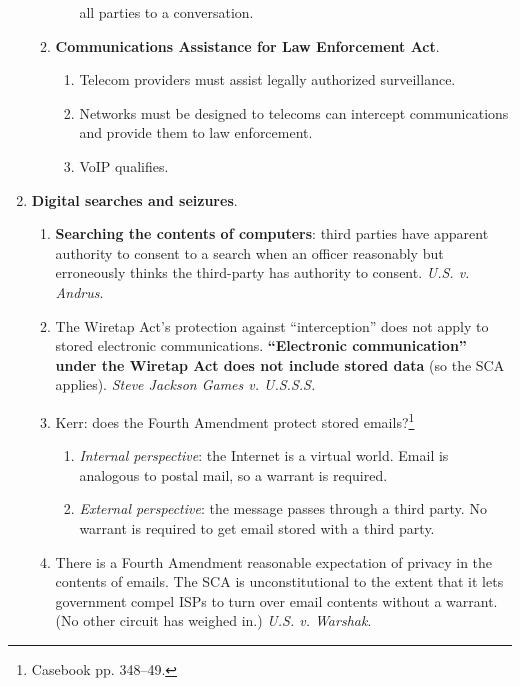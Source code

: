 \begin{enumerate}
\begin{enumerate}
\begin{enumerate}
            all parties to a conversation.
        \end{enumerate}
        \item \textbf{Communications Assistance for Law Enforcement Act}.
        \begin{enumerate}
            \item Telecom providers must assist legally authorized 
            surveillance.
            \item Networks must be designed to telecoms can intercept 
            communications and provide them to law enforcement.
            \item VoIP qualifies.
        \end{enumerate}
    \end{enumerate}
    \item \textbf{Digital searches and seizures}.
    \begin{enumerate}
        \item \textbf{Searching the contents of computers}: third parties have 
        apparent authority to consent to a search when an officer reasonably 
        but erroneously thinks the third-party has authority to consent. 
        \emph{U.S. v. Andrus}.
        \item The Wiretap Act's protection against ``interception'' does not 
        apply to stored electronic communications. \textbf{``Electronic 
        communication'' under the Wiretap Act does not include stored data} 
        (so the SCA applies). \emph{Steve Jackson Games v. U.S.S.S.}
        \item Kerr: does the Fourth Amendment protect stored 
        emails?\footnote{Casebook pp. 348--49.}
        \begin{enumerate}
            \item \emph{Internal perspective}: the Internet is a virtual 
            world. Email is analogous to postal mail, so a warrant is 
            required.
            \item \emph{External perspective}: the message passes through a 
            third party. No warrant is required to get email stored with a 
            third party.
        \end{enumerate}
        \item There is a Fourth Amendment reasonable expectation of privacy in 
        the contents of emails. The SCA is unconstitutional to the extent that 
        it lets government compel ISPs to turn over email contents without a 
        warrant. (No other circuit has weighed in.) \emph{U.S. v. Warshak}.

\end{enumerate}
\end{enumerate}
